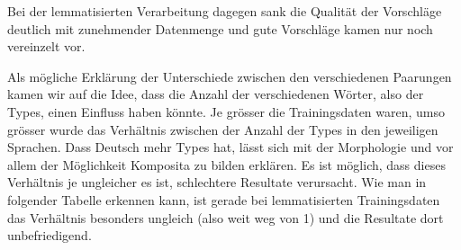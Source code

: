 \documentclass[11pt,twoside,openright]{mpreport}
\begin{document}
Bei der lemmatisierten Verarbeitung dagegen sank die Qualität der Vorschläge deutlich mit zunehmender Datenmenge und gute Vorschläge kamen nur noch vereinzelt vor.

\hspace{-6cm}

Als mögliche Erklärung der Unterschiede zwischen den verschiedenen Paarungen kamen wir auf die Idee, dass die Anzahl der verschiedenen Wörter, also der Types, einen Einfluss haben könnte. Je grösser die Trainingsdaten waren, umso grösser wurde das Verhältnis zwischen der Anzahl der Types in den jeweiligen Sprachen. Dass Deutsch mehr Types hat, lässt sich mit der Morphologie und vor allem der Möglichkeit Komposita zu bilden erklären. Es ist möglich, dass dieses Verhältnis je ungleicher es ist, schlechtere Resultate verursacht. Wie man in folgender Tabelle erkennen kann, ist gerade bei lemmatisierten Trainingsdaten das Verhältnis besonders ungleich (also weit weg von 1) und die Resultate dort unbefriedigend.
\end{document}
